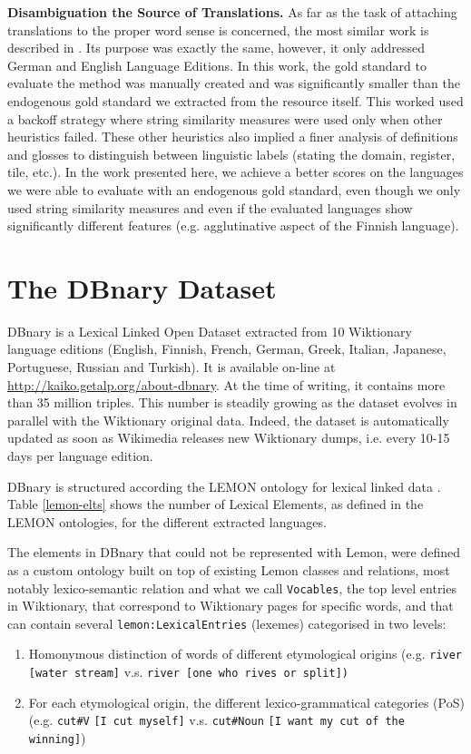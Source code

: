 \documentclass[10pt, a4paper]{article}
\begin{document}
\textbf{Disambiguation the Source of Translations.} As far as the task of attaching translations to the proper word sense is concerned, the most similar work is described in \cite{meyer-gurevych:2012:PAPERS}. Its purpose was exactly the same, however, it only addressed German and English Language Editions. In this work, the gold standard to evaluate the method was manually created and was significantly smaller than the endogenous gold standard we extracted from the resource itself. This worked used a backoff strategy where string similarity measures were used only when other heuristics failed. These other heuristics also implied a finer analysis of definitions and glosses to distinguish between linguistic labels (stating the domain, register, tile, etc.). In the work presented here, we achieve a better scores on the languages we were able to evaluate with an endogenous gold standard, even though we only used string similarity measures and even if the evaluated languages show significantly different features (e.g. agglutinative aspect of the Finnish language).

\section{The DBnary Dataset}

DBnary is a Lexical Linked Open Dataset extracted from 10 Wiktionary language editions (English, Finnish, French, German, Greek, Italian, Japanese, Portuguese, Russian and Turkish). It is available on-line at \url{http://kaiko.getalp.org/about-dbnary}. At the time of writing, it contains more than 35 million triples. This number is steadily growing as the dataset evolves in parallel with the Wiktionary original data. Indeed, the dataset is automatically updated as soon as Wikimedia releases new Wiktionary dumps, i.e. every 10-15 days per language edition. 

DBnary is structured according the LEMON ontology for lexical linked data \cite{DBLP:conf/esws/McCraeSC11}. Table \ref{lemon-elts} shows the number of Lexical Elements, as defined in the LEMON ontologies, for the different extracted languages. 

The elements in DBnary that could not be represented with Lemon, were defined as a custom ontology built on top of existing Lemon classes and relations, most notably lexico-semantic relation and what we call \verb|Vocables|, the top level entries in Wiktionary, that correspond to Wiktionary pages for specific words, and that can contain several \verb|lemon:LexicalEntries| (lexemes) categorised in two levels:
\begin{enumerate}
	\item Homonymous distinction of words of different etymological origins (e.g. \verb|river [water stream]| v.s. \verb|river [one who rives or split])|
	\item For each etymological origin, the different lexico-grammatical categories (PoS) (e.g. \verb|cut#V| \verb|[I cut myself]| v.s. \verb|cut#Noun| \verb|[I want my cut of the winning]|)
\end{enumerate}
\end{document}
